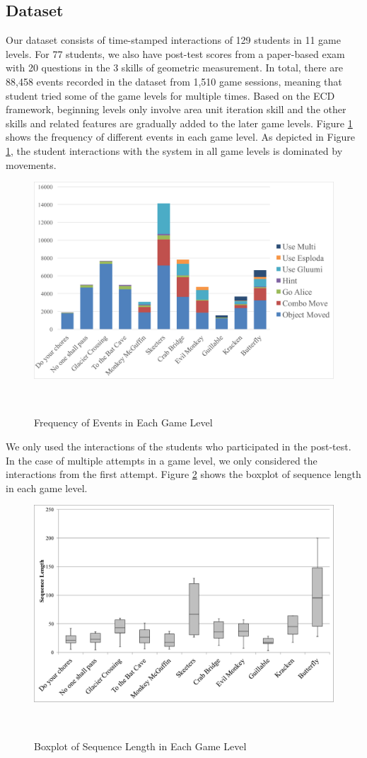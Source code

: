 \documentclass{sigchi}
\begin{document}
\subsection{Dataset} 
Our dataset consists of time-stamped interactions of 129 students in 11 game levels. 
For 77 students, we also have post-test scores from a paper-based exam with 20 questions in the 3 skills of geometric measurement.
In total, there are 88,458 events recorded in the dataset from 1,510 game sessions, meaning that student tried some of the game levels for multiple times.
Based on the ECD framework, beginning levels only involve area unit iteration skill and the other skills and related features are gradually added to the later game levels.
Figure \ref{fig:frequency} shows the frequency of different events in each game level. As depicted in Figure \ref{fig:frequency}, the student interactions with the system in all game levels is dominated by movements.

\begin{figure}
	\centering
	\includegraphics[width=0.9\columnwidth]{figures/frequency}
	\caption{Frequency of Events in Each Game Level}~\label{fig:frequency}
\end{figure}

We only used the interactions of the students who participated in the post-test.
In the case of multiple attempts in a game level, we only considered the interactions from the first attempt.
Figure \ref{fig:boxplot} shows the boxplot of sequence length in each game level. 

\begin{figure}
	\centering
	\includegraphics[width=0.9\columnwidth]{figures/boxplot}
	\caption{Boxplot of Sequence Length in Each Game Level}~\label{fig:boxplot}
\end{figure}
\end{document}

